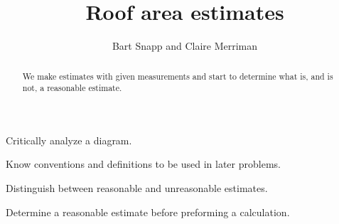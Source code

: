 \documentclass[handout,nooutcomes,noauthor,hints]{ximera}
\title{Roof area estimates}
\author{Bart Snapp and Claire Merriman}
\begin{document}
\begin{abstract}
 We make estimates with given measurements and start to determine what
 is, and is not, a reasonable estimate.
\end{abstract}
\maketitle

\begin{listOutcomes}
\item Critically analyze a diagram.
\item Know conventions and definitions to be used in later problems.
\item Distinguish between reasonable and unreasonable estimates.
\item Determine a reasonable estimate before preforming a calculation.
\end{listOutcomes}
\end{document}
